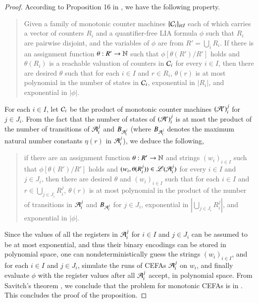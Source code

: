 \begin{proof}
	According to Proposition 16 in \cite{LB16}, we have the following property. 
	\begin{quote}
		Given a family of monotonic counter machines $\{ \mathcal{C}_i \}_{i\in I}$ each of which carries a vector of counters $R_i$ and a quantifier-free LIA formula $\phi$ such that $ R_i$ are pairwise disjoint,  and the variables of $\phi$ are from $R'=\bigcup_{i} R_i$. If there is an assignment function $\theta: R' \rightarrow \mathbb{N}$ such that $\phi[\theta(R' )/R']$ holds and $\theta(R_i)$ is a reachable valuation of counters in $\mathcal{C}_i$ for every $i \in I$, then there are desired $\theta$ such that for each $i \in I$ and $r \in R_i$, $\theta(r)$ is at most polynomial in the number of states in $\mathcal{C}_i $, exponential in $|R_i|$, and exponential in $|\phi|$.
	\end{quote}
	For each $i \in I$, let $\mathcal{C}_i$ be the product of monotonic counter machines $(\mathcal{A}')_i^j$ for $j \in J_i$. 
	From the fact that the number of states of $(\mathcal{A}')_i^j$ is at most the product of the number of transitions of $\mathcal{A}_i^j$ and $B_{\mathcal{A}_i^j}$ (where $B_{\mathcal{A}_i^j}$ denotes the maximum natural number constants $\eta(r)$ in $\mathcal{A}_i^j$), we deduce the following,
	\begin{quote}
		if there are an assignment function $\theta: R' \rightarrow \mathbb{N}$ and strings $(w_i)_{i \in I}$ such that  $\phi[\theta(R' )/R']$ holds and $(w_i, \theta(R_i^j)) \in \mathscr{L}(\mathcal{A}_i^j)$ for every $i \in I$ and $j \in J_i$, then there are desired $\theta$ and $(w_i)_{i \in I}$ such that for each $i \in I$ and $r \in \bigcup_{j \in J_i} R^j_i$, $\theta(r)$ is at most polynomial in the product of the number of transitions in $\mathcal{A}_i^j$ and $B_{\mathcal{A}_i^j}$ for $j \in J_i$, exponential in $\left|\bigcup_{j \in J_i} R^j_i \right|$, and exponential in $|\phi|$.
	\end{quote}
	
	Since the values of all the registers in $\mathcal{A}_i^j$ for $i \in I$ and $ j \in J_i$ can be assumed to be at most exponential, and thus their binary encodings can be stored in polynomial space, one can nondeterministically guess the strings $(w_i)_{i \in I}$, and for each $i \in I$ and $j \in J_i$, simulate the runs of CEFAs $\mathcal{A}_i^j$ on $w_i$, and finally evaluate $\phi$ with the register values after all $\mathcal{A}_{i}^{j}$ accept, in polynomial space. From Savitch's theorem \cite{complexity-book}, we conclude that the {\lasat} problem for monotonic CEFAs is in {\pspace}. This concludes the proof of the proposition.
\end{proof}

